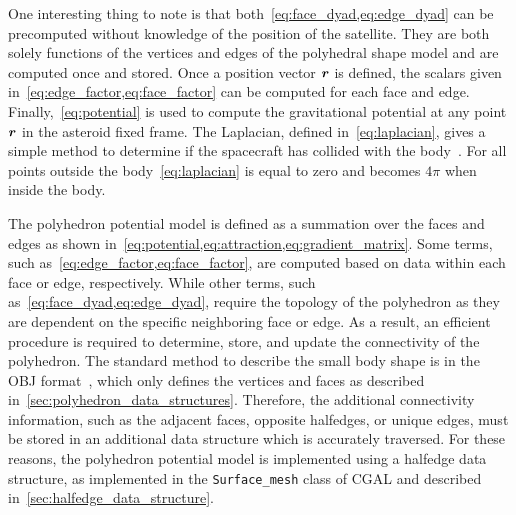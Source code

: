 One interesting thing to note is that both~\cref{eq:face_dyad,eq:edge_dyad} can be precomputed without knowledge of the position of the satellite.
They are both solely functions of the vertices and edges of the polyhedral shape model and are computed once and stored.
Once a position vector \( \bm{r} \) is defined, the scalars given in~\cref{eq:edge_factor,eq:face_factor} can be computed for each face and edge.
Finally,~\cref{eq:potential} is used to compute the gravitational potential at any point \( \bm{r} \) in the asteroid fixed frame.
The Laplacian, defined in~\cref{eq:laplacian}, gives a simple method to determine if the spacecraft has collided with the body~\cite{werner1996}. 
For all points outside the body~\cref{eq:laplacian} is equal to zero and becomes \( 4 \pi \) when inside the body.

The polyhedron potential model is defined as a summation over the faces and edges as shown in~\cref{eq:potential,eq:attraction,eq:gradient_matrix}.
Some terms, such as~\cref{eq:edge_factor,eq:face_factor}, are computed based on data within each face or edge, respectively.
While other terms, such as~\cref{eq:face_dyad,eq:edge_dyad}, require the topology of the polyhedron as they are dependent on the specific neighboring face or edge.
As a result, an efficient procedure is required to determine, store, and update the connectivity of the polyhedron. 
The standard method to describe the small body shape is in the OBJ format~\cite{neese2004}, which only defines the vertices and faces as described in~\cref{sec:polyhedron_data_structures}.
Therefore, the additional connectivity information, such as the adjacent faces, opposite halfedges, or unique edges, must be stored in an additional data structure which is accurately traversed.
For these reasons, the polyhedron potential model is implemented using a halfedge data structure, as implemented in the \texttt{Surface\_mesh} class of CGAL and described in~\cref{sec:halfedge_data_structure}.


 

